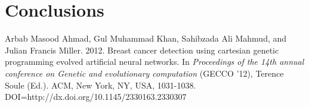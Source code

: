 \clearpage



\subsection{}



\subsection{}



\clearpage

\section{}






\clearpage



\section{Conclusions}



\clearpage

\begin{thebibliography}{}


\clearpage



\clearpage


\bibitem{} Arbab Masood Ahmad, Gul Muhammad Khan, Sahibzada Ali Mahmud, and Julian Francis Miller. 2012. Breast cancer detection using cartesian genetic programming evolved artificial neural networks.  In \emph{Proceedings of the 14th annual conference on Genetic and evolutionary computation} (GECCO '12), Terence Soule (Ed.). ACM, New York, NY, USA,  1031-1038. DOI=http://dx.doi.org/10.1145/2330163.2330307
\end{thebibliography}


